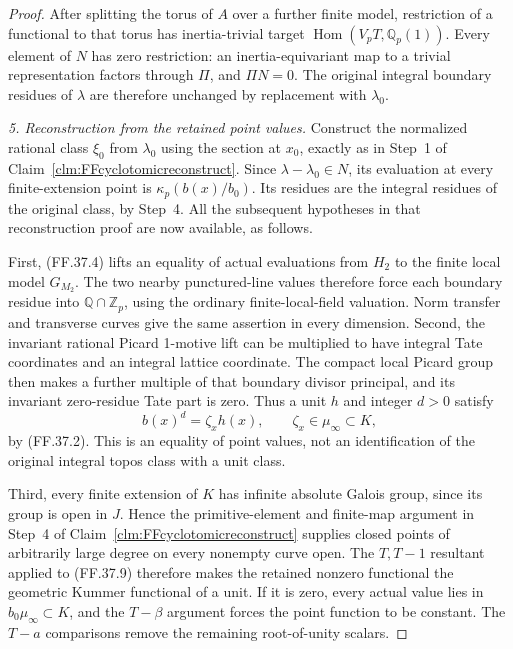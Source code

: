 \begin{proof}
After splitting the torus of \(A\)
over a further finite model, restriction
of a functional to that torus has
inertia-trivial target
\(\operatorname{Hom}(V_pT,\mathbb Q_p(1))\).
Every element of \(N\) has zero
restriction: an inertia-equivariant
map to a trivial representation
factors through \(\Pi\), and
\(\Pi N=0\). The original integral
boundary residues of \(\lambda\)
are therefore unchanged by replacement
with \(\lambda_0\).

\emph{5. Reconstruction from the retained point values.}
Construct the normalized rational
class \(\xi_0\) from \(\lambda_0\)
using the section at \(x_0\),
exactly as in Step~1 of
Claim~\ref{clm:FFcyclotomicreconstruct}.
Since \(\lambda-\lambda_0\in N\),
its evaluation at every finite-extension
point is \(\kappa_p(b(x)/b_0)\).
Its residues are the integral residues
of the original class, by Step~4.
All the subsequent hypotheses in
that reconstruction proof are now
available, as follows.

First, (FF.37.4) lifts an equality
of actual evaluations from \(H_2\)
to the finite local model \(G_{M_2}\).
The two nearby punctured-line values
therefore force each boundary residue
into \(\mathbb Q\cap\mathbb Z_p\),
using the ordinary finite-local-field
valuation. Norm transfer and transverse
curves give the same assertion in
every dimension. Second, the invariant
rational Picard 1-motive lift can
be multiplied to have integral Tate
coordinates and an integral lattice
coordinate. The compact local Picard
group then makes a further multiple
of that boundary divisor principal,
and its invariant zero-residue Tate
part is zero. Thus a unit \(h\)
and integer \(d>0\) satisfy
\[
                    b(x)^d=\zeta_xh(x),
                         \qquad\zeta_x\in\mu_\infty\subset K,
                                                        \tag{FF.37.9}
\]
by (FF.37.2). This is an equality
of point values, not an identification
of the original integral topos class
with a unit class.

Third, every finite extension of
\(K\) has infinite absolute Galois
group, since its group is open in
\(J\). Hence the primitive-element
and finite-map argument in Step~4
of Claim~\ref{clm:FFcyclotomicreconstruct}
supplies closed points of arbitrarily
large degree on every nonempty
curve open. The \(T,T-1\) resultant
applied to (FF.37.9) therefore makes
the retained nonzero functional the
geometric Kummer functional of a unit.
If it is zero, every actual value
lies in \(b_0\mu_\infty\subset K\),
and the \(T-\beta\) argument forces
the point function to be constant.
The \(T-a\) comparisons remove the
remaining root-of-unity scalars.


\end{proof}
